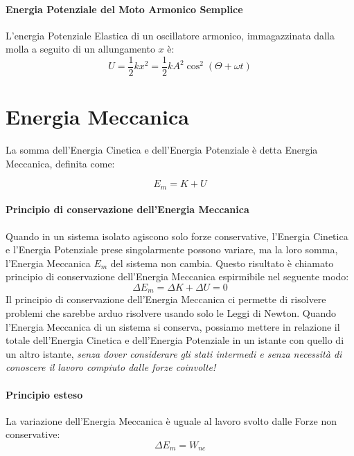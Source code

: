         \paragraph{Energia Potenziale del Moto Armonico Semplice} L'energia 
        Potenziale Elastica di un oscillatore armonico, immagazzinata dalla 
        molla a seguito di un allungamento $x$ è:
        \begin{equation}
            U = \frac{1}{2}kx^2 = \frac{1}{2}kA^2\cos^2(\Theta + \omega t)
        \end{equation}

    \section{Energia Meccanica} La somma dell'Energia Cinetica e dell'Energia
    Potenziale è detta Energia Meccanica, definita come:

        \begin{equation}
            E_m = K + U
        \end{equation}

        \paragraph{Principio di conservazione dell'Energia Meccanica} Quando in 
        un sistema isolato agiscono solo forze conservative, l'Energia Cinetica 
        e l'Energia Potenziale prese singolarmente possono variare, ma la loro
        somma, l'Energia Meccanica $E_m$ del sistema non cambia. Questo 
        risultato è chiamato principio di conservazione dell'Energia Meccanica
        espirmibile nel seguente modo:
        \begin{equation}
            \Delta E_m = \Delta K + \Delta U = 0
        \end{equation}
        Il principio di conservazione dell'Energia Meccanica ci permette di 
        risolvere problemi che sarebbe arduo risolvere usando solo le Leggi di 
        Newton.
        Quando l'Energia Meccanica di un sistema si conserva, possiamo mettere
        in relazione il totale dell'Energia Cinetica e dell'Energia Potenziale
        in un istante con quello di un altro istante, \textit{senza dover
        considerare gli stati intermedi e senza necessità di conoscere il 
        lavoro compiuto dalle forze coinvolte!}

        \paragraph{Principio esteso} La variazione dell'Energia Meccanica è 
        uguale al lavoro svolto dalle Forze non conservative:
        \begin{equation}
            \Delta E_m = W_{nc}
        \end{equation}
        


